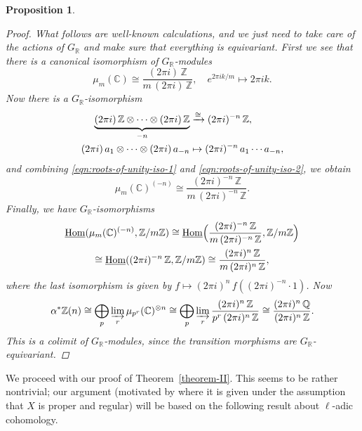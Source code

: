 \documentclass[draft,leqno,12pt]{article}
\theoremstyle{plain}
\newtheorem{proposition}[theorem]{\indent\sc Proposition}
\theoremstyle{definition}
\DeclareMathOperator{\Hom}{Hom}
\newcommand{\ZZ}{\mathbb{Z}}
\newcommand{\QQ}{\mathbb{Q}}
\newcommand{\RR}{\mathbb{R}}
\newcommand{\CC}{\mathbb{C}}
\newcommand{\iHom}{\underline{\Hom}}
\begin{document}
\begin{proposition}
\begin{proof}
    What follows are well-known calculations, and we just need to take care of
    the actions of $G_\RR$ and make sure that everything is equivariant. First
    we see that there is a canonical isomorphism of $G_\RR$-modules
    \begin{equation}
      \label{eqn:roots-of-unity-iso-1}
      \mu_m (\CC) \cong \frac{(2\pi i) \, \ZZ}{m\,(2\pi i)\,\ZZ}, \quad
      e^{2\pi i k/m} \mapsto 2\pi i k.
    \end{equation}
    Now there is a $G_\RR$-isomorphism
    \begin{align}
      \label{eqn:roots-of-unity-iso-2}
      \underbrace{(2\pi i)\,\ZZ\otimes\cdots\otimes (2\pi i)\,\ZZ}_{-n} & \xrightarrow{\cong} (2\pi i)^{-n}\,\ZZ,\\
      \notag (2\pi i)\,a_1\otimes\cdots\otimes (2\pi i)\,a_{-n} & \mapsto (2\pi i)^{-n}\,a_1\cdots a_{-n},
    \end{align}
    and combining \eqref{eqn:roots-of-unity-iso-1}
    and \eqref{eqn:roots-of-unity-iso-2}, we obtain
    $$\mu_m (\CC)^{(-n)} \cong \frac{(2\pi i)^{-n} \, \ZZ}{m\,(2\pi i)^{-n}\,\ZZ}.$$
    Finally, we have $G_\RR$-isomorphisms
    \begin{multline*}
      \iHom (\mu_m (\CC)^{(-n)}, \ZZ/m\ZZ) \cong
      \iHom \Bigl(\frac{(2\pi i)^{-n} \, \ZZ}{m\,(2\pi i)^{-n}\,\ZZ}, \ZZ/m\ZZ\Bigr) \\
      \cong
      \iHom ((2\pi i)^{-n}\,\ZZ, \ZZ/m\ZZ) \cong
      \frac{(2\pi i)^n\,\ZZ}{m\,(2\pi i)^n\,\ZZ},
    \end{multline*}
    where the last isomorphism is given by
    $f \mapsto (2\pi i)^n \, f ((2\pi i)^{-n}\cdot 1)$.
    Now
    \[ \alpha^* \ZZ (n) \cong
    \bigoplus_p \varinjlim_r \mu_{p^r} (\CC)^{\otimes n} \cong
    \bigoplus_p \varinjlim_r \frac{(2\pi i)^n\,\ZZ}{p^r\,(2\pi i)^n\,\ZZ} \cong
    \frac{(2\pi i)^n\,\QQ}{(2\pi i)^n\,\ZZ}. \]
    This is a colimit of $G_\RR$-modules, since the transition morphisms are
    $G_\RR$-equivariant.
  \end{proof}
\end{proposition}

We proceed with our proof of Theorem~\ref{theorem-II}. This seems to be rather
nontrivial; our argument (motivated by \cite{Flach-Morin-2018} where it is given
under the assumption that $X$ is proper and regular) will be based on the
following result about $\ell$-adic cohomology.
\end{document}
